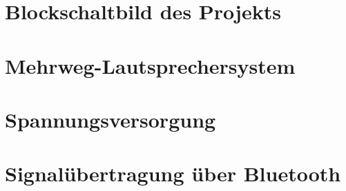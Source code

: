 \newpage
\section{Blockschaltbild des Projekts}


\section{Mehrweg-Lautsprechersystem}


\section{Spannungsversorgung}


\section{Signalübertragung über Bluetooth}

